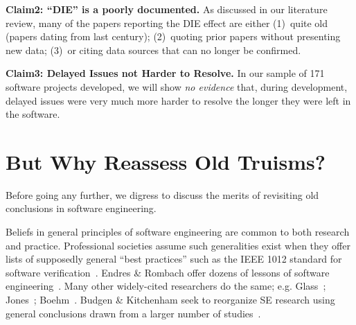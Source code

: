 \documentclass[smallcondesed]{svjour3}
\begin{document}
{\bf  Claim2: ``DIE'' is a poorly documented.}
 As discussed in our literature review,  many of the papers reporting the DIE
effect are either (1)~quite old (papers dating from last century);
(2)~quoting prior papers without presenting   new data; 
(3)~or citing data sources that can no longer be
confirmed. 

{\bf Claim3: Delayed Issues not Harder to Resolve.}
 In our sample of 
 171 software  projects developed, we will show
{\em no evidence}  that, during development, delayed issues were very much more harder to resolve the longer they were left
 in the software. 
 


 
 


\section{ But Why Reassess Old Truisms?}

Before going any further,  we digress to discuss the merits of revisiting
old conclusions in software engineering.


Beliefs in general
principles of software
engineering are common to both research and practice. Professional societies assume such generalities exist when they offer
 lists of supposedly general ``best practices'' such as
the IEEE 1012 standard for software verification~\cite{1012}. 
 Endres \& Rombach offer dozens of lessons of software engineering~\cite{endres03}.
 Many other 
widely-cited researchers  do the same; e.g.
Glass~\cite{glass02}; Jones~\cite{jones07}; Boehm~\cite{boehm00b}.
Budgen \& Kitchenham seek to reorganize SE research using
general
conclusions drawn from a larger number of studies~\cite{kitch04,budgen09}.
\end{document}

